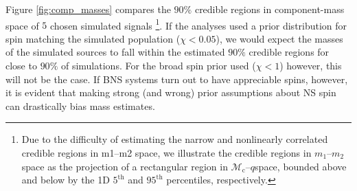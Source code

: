 Figure \ref{fig:comp_masses} compares the $90\%$ credible regions in component-mass space of $5$ chosen simulated signals \citep[cf.][figure 1]{Chatziioannou_2014}\footnote{Due to the difficulty of estimating the narrow and nonlinearly correlated credible regions in m1–m2 space, we illustrate the credible regions in $m_1$--$m_2$ space as the projection of a rectangular region in $\mathcal{M}_\mathrm{c}$--$q$space, bounded above and below by the 1D $5^\mathrm{th}$ and $95^\mathrm{th}$ percentiles, respectively.}. If the analyses used a prior distribution for spin matching the simulated population ($\chi < 0.05$), we would expect the masses of the simulated sources to fall within the estimated $90\%$ credible regions for close to $90\%$ of simulations. For the broad spin prior used ($\chi < 1$) however, this will not be the case.  If BNS systems turn out to have appreciable spins, however, it is evident that making strong (and wrong) prior assumptions about NS spin can drastically bias mass estimates.
  
  
  